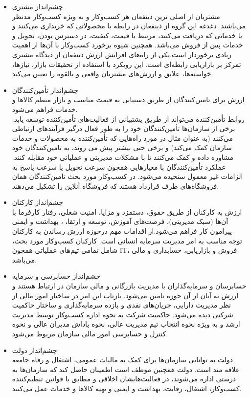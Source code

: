 \documentclass[14pt]{article}
\begin{document}
\begin{flushright}
\begin{itemize}
\item چشم‌انداز مشتری\\
مشتریان از اصلی ترین ذینفعان هر کسب‌وکار و به ویژه کسب‌و‌کار مدنظر می‌باشند. دغدغه این گروه از ذینفعان در رابطه با محصولاتی که خریداری می‌کنند و یا خدماتی که دریافت می‌کنند، مرتبط با قیمت، کیفیت، در دسترس بودن، تحویل و خدمات پس از فروش می‌باشد. همچنین شیوه برخورد کسب‌وکار با آن‌ها از اهمیت زیادی برخوردار است.یکی از راه‌های افزایش ارزش ذینفعان از دیدگاه مشتری تمرکز بر بازاریابی رابطه‌ای است. این رویکرد با استفاده از تحقیقات بازار، نیازها، خواسته‌ها، علایق و ارزش‌های مشتریان واقعی و بالقوه را تعیین می‌کند.\\
\item ‌چشم‌انداز تأمین‌کنندگان\\
ارزش برای تامین‌کنندگان از طریق دستیابی به قیمت مناسب و بازار منظم کالاها و خدمات فراهم می‌شود.\\
روابط تأمین‌کننده می‌تواند از طریق پشتیبانی از فعالیت‌های تأمین‌کننده توسعه یابد. برخی از سازمان‌ها تأمین‌کنندگان خود را به طور فعال درگیر فرآیندهای ارتباطی می‌کنند (به عنوان مثال در مورد راه‌هایی که تأمین‌کننده به محصولات و خدمات سازمان کمک می‌کند) و برخی حتی بیشتر پیش می روند، به تامین‌کنندگان خود مشاوره داده و کمک می‌کنند تا با مشکلات مدیریتی و عملیاتی خود مقابله کنند. عملکرد تأمین‌کنندگان با معیارهایی همچون سرعت تحویل یا سرعت پاسخ به الزامات غیر معمول سنجیده می‌شود. در کسب‌وکار مورد بحث تامین‌کنندگان همان فروشگاه‌های طرف قرارداد هستند که فروشگاه آنلاین را تشکیل می‌دهند.\\
 \item چشم‌انداز کارکنان\\
ارزش به کارکنان از طریق حقوق، دستمزد و مزایا، امنیت شغلی، رفتار کارفرما با آن‌ها (سبک مدیریتی)، فرصت‌های آموزش، توسعه و ارتقا، ، بهداشت و ایمنی پیرامون کار فراهم می‌شود.از اقدامات مهم درحوزه ارزش رساندن به کارکنان توجه مناسب به امر مدیریت سرمایه انسانی است. کارکنان کسب‌وکار مورد بحث، شامل تمامی تیم‌های عملیاتی همچون IT، فروش و بازاریابی، حسابداری و مالی می‌باشد.\\
 \item چشم‌انداز حسابرسی و سرمایه\\
حسابرسان و سرمایه‌گذاران با مدیریت بازرگانی و مالی سازمان در ارتباط هستند و ارزش به آنان از آن حوزه تامین می‌شود. بازتاب این امر در ساختار امور مالی از نظر مدیریت دارایی، جریان‌های نقدی و بازده سرمایه‌گذاری و ساختار حاکمیت شرکتی دیده می‌شود. حاکمیت شرکت به نحوه اداره کسب‌وکار توسط مدیریت ارشد و به ویژه نحوه انتخاب تیم مدیریت عالی، نحوه پاداش مدیران عالی و نحوه کنترل و حسابرسی امور مالی سازمان مربوط می‌شود.\\
\item ‌چشم‌انداز دولت\\
دولت به توانایی سازمان‌ها برای کمک به مالیات عمومی، اشتغال و رفاه جامعه علاقه مند است. دولت همچنین موظف است اطمینان حاصل کند که سازمان‌ها به درستی اداره می‌شوند، در فعالیت‌هایشان اخلاقی و مطابق با قوانین تنظیم‌کننده کسب‌وکار، اشتغال، رقابت، بهداشت و ایمنی و تهیه کالاها و خدمات عمل می‌کنند. \\





\end{itemize}
\end{flushright}
\end{document}
